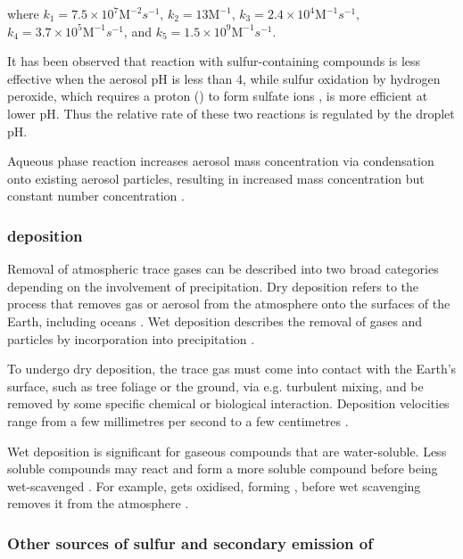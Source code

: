 where 
$k_1 = 7.5 \times 10^7 \mathrm{M}^{-2}s^{-1}$,
$k_2 = 13 \mathrm{M}^{-1}$,
$k_3 = 2.4 \times 10^4 \mathrm{M}^{-1}s^{-1}$,
$k_4 = 3.7 \times 10^5 \mathrm{M}^{-1}s^{-1}$, and
$k_5 = 1.5 \times 10^9 \mathrm{M}^{-1}s^{-1}$. 

It has been observed that  reaction with sulfur-containing compounds is less effective when the aerosol pH is less than 4, while sulfur oxidation by hydrogen peroxide, which requires a proton () to form sulfate ions \citep{seinfeldAtmosphericChemistryPhysics2016}, is more efficient at lower pH. Thus the relative rate of these two reactions is regulated by the droplet pH. 

Aqueous phase reaction increases aerosol mass concentration via condensation onto existing aerosol particles, resulting in increased mass concentration but constant number concentration \citep{seinfeldAtmosphericChemistryPhysics2016}.


\subsubsection{ deposition}

Removal of atmospheric trace gases can be described into two broad categories depending on the involvement of precipitation. Dry deposition refers to the process that removes gas or aerosol from the atmosphere onto the surfaces of the Earth, including oceans \citep{dewysAssessmentFateSulfur1978}.  Wet deposition describes the removal of gases and particles by incorporation into precipitation \citep{wayneChemistryAtmospheresIntroduction2006}. 

To undergo dry deposition, the trace gas must come into contact with the Earth's surface, such as tree foliage or the ground, via e.g. turbulent mixing, and be removed by some specific chemical or biological interaction.  Deposition velocities range from a few millimetres per second to a few centimetres \citep[e.g.][]{smithAirborneTransportSulphur1975, hardacreEvaluationSO2SO422021, mulcahyUKESM1DevelopmentEvaluation2022}.

Wet deposition is significant for gaseous compounds that are water-soluble. Less soluble compounds may react and form a more soluble compound before being wet-scavenged \citep{wayneChemistryAtmospheresIntroduction2006}. For example,  gets oxidised, forming , before wet scavenging removes it from the atmosphere \citep{seinfeldAtmosphericChemistryPhysics2016}.


\subsubsection{Other sources of sulfur and secondary emission of }
\label{ch1:other-so2}

